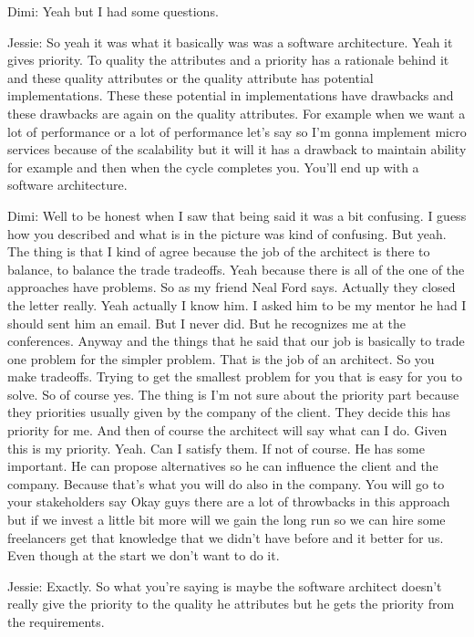 Dimi: Yeah but I had some questions.

Jessie: So yeah it was what it basically was was a software architecture. Yeah it gives priority. To quality the attributes and a priority has a rationale behind it and these quality attributes or the quality attribute has potential implementations. These these potential in implementations have drawbacks and these drawbacks are again on the quality attributes. For example when we want a lot of performance or a lot of performance let's say so I'm gonna implement micro services because of the scalability but it will it has a drawback to maintain ability for example and then when the cycle completes you. You'll end up with a software architecture.

Dimi: Well to be honest when I saw that being said it was a bit confusing. I guess how you described and what is in the picture was kind of confusing. But yeah. The thing is that I kind of agree because the job of the architect is there to balance, to balance the trade tradeoffs. Yeah because there is all of the one of the approaches have problems. So as my friend Neal Ford says. Actually they closed the letter really. Yeah actually I know him. I asked him to be my mentor he had I should sent him an email. But I never did. But he recognizes me at the conferences. Anyway and the things that he said that our job is basically to trade one problem for the simpler problem. That is the job of an architect. So you make tradeoffs. Trying to get the smallest problem for you that is easy for you to solve. So of course yes. The thing is I'm not sure about the priority part because they priorities usually given by the company of the client. They decide this has priority for me. And then of course the architect will say what can I do. Given this is my priority. Yeah. Can I satisfy them. If not of course. He has some important. He can propose alternatives so he can influence the client and the company. Because that's what you will do also in the company. You will go to your stakeholders say Okay guys there are a lot of throwbacks in this approach but if we invest a little bit more will we gain the long run so we can hire some freelancers get that knowledge that we didn't have before and it better for us. Even though at the start we don't want to do it.

Jessie: Exactly. So what you're saying is maybe the software architect doesn't really give the priority to the quality he attributes but he gets the priority from the requirements.

